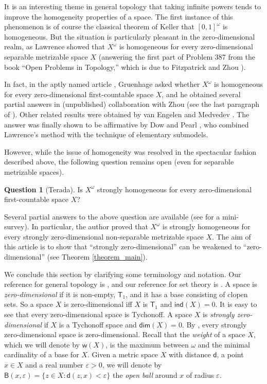 \documentclass{amsart}
\theoremstyle{plain}
\theoremstyle{definition}
\newtheorem{question}[theorem]{Question}
\newcommand{\Ball}{\mathsf{B}}
\newcommand{\di}{\mathsf{d}}
\newcommand{\weight}{\mathsf{w}}
\begin{document}
It is an interesting theme in general topology that taking infinite powers tends to improve the homogeneity properties of a space. The first instance of this phenomenon is of course the classical theorem of Keller \cite{keller} that $[0,1]^\omega$ is homogeneous. But the situation is particularly pleasant in the zero-dimensional realm, as Lawrence \cite{lawrence} showed that $X^\omega$ is homogeneous for every zero-dimensional separable metrizable space $X$ (answering the first part of Problem 387 from the book ``Open Problems in Topology,'' which is due to Fitzpatrick and Zhou \cite[Problem 4]{fitzpatrick_zhou}).

In fact, in the aptly named article \cite{new_classic}, Gruenhage asked whether $X^\omega$ is homogeneous for every zero-dimensional first-countable space $X$, and he obtained several partial answers in (unpublished) collaboration with Zhou (see the last paragraph of \cite{van_engelen}). Other related results were obtained by van Engelen \cite{van_engelen} and Medvedev \cite{medvedev_baire}. The answer was finally shown to be affirmative by Dow and Pearl \cite{dow_pearl}, who combined Lawrence's method with the technique of elementary submodels.

However, while the issue of homogeneity was resolved in the spectacular fashion described above, the following question \cite{terada} remains open (even for separable metrizable spaces).
\begin{question}[Terada]
Is $X^\omega$ strongly homogeneous for every zero-dimensional first-countable space $X$?	
\end{question}

Several partial answers to the above question are available (see \cite[Section 5]{medini_van_mill_zdomskyy} for a mini-survey). In particular, the author \cite[Corollary 29]{medini_products} proved that $X^\omega$ is strongly homogeneous for every strongly zero-dimensional non-separable metrizable space $X$. The aim of this article is to show that ``strongly zero-dimensional'' can be weakened to ``zero-dimensional'' (see Theorem \ref{theorem_main}).

We conclude this section by clarifying some terminology and notation. Our reference for general topology is \cite{engelking}, and our reference for set theory is \cite{jech}. A space is \emph{zero-dimensional} if it is non-empty, $\mathsf{T}_1$, and it has a base consisting of clopen sets. So a space $X$ is zero-dimensional iff $X$ is $\mathsf{T}_1$ and $\mathsf{ind}(X)=0$. It is easy to see that every zero-dimensional space is Tychonoff. A space $X$ is \emph{strongly zero-dimensional} if $X$ is a Tychonoff space and $\mathsf{dim}(X)=0$. By \cite[Theorem 6.2.6]{engelking}, every strongly zero-dimensional space is zero-dimensional. Recall that the \emph{weight} of a space $X$, which we will denote by $\weight(X)$, is the maximum between $\omega$ and the minimal cardinality of a base for $X$. Given a metric space $X$ with distance $\di$, a point $x\in X$ and a real number $\varepsilon >0$, we will denote by $\Ball(x,\varepsilon)=\{z\in X:\di(z,x)<\varepsilon\}$ the \emph{open ball} around $x$ of radius $\varepsilon$.
\end{document}
